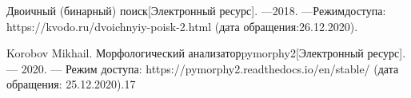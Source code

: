 \begin{thebibliography}{9}
    \label{cha:biblio}
    
     Двоичный (бинарный) поиск[Электронный ресурс]. —2018. —Режимдоступа: https://kvodo.ru/dvoichnyiy-poisk-2.html (дата обращения:26.12.2020).
    
     Korobov Mikhail. Морфологический анализаторpymorphy2[Электронный ресурс]. — 2020. — Режим доступа: https://pymorphy2.readthedocs.io/en/stable/ (дата обращения: 25.12.2020).17

\end{thebibliography}
